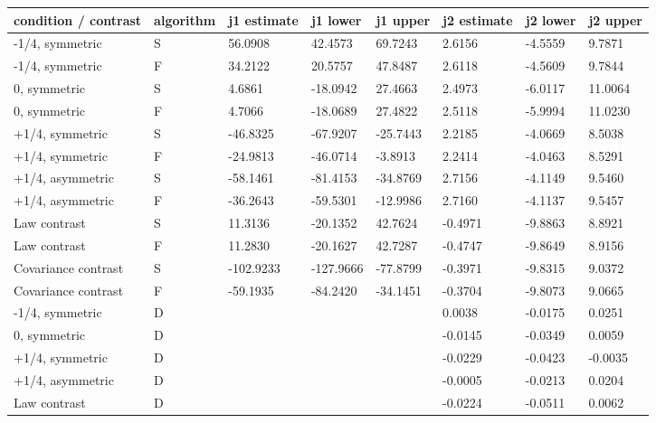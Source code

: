 \begin{tabular}{llllllll}
condition / contrast & algorithm & j1 estimate & j1 lower & j1 upper & j2 estimate & j2 lower & j2 upper \\
\hline
-1/4, symmetric & S & 56.0908 & 42.4573 & 69.7243 & 2.6156 & -4.5559 & 9.7871 \\
-1/4, symmetric & F & 34.2122 & 20.5757 & 47.8487 & 2.6118 & -4.5609 & 9.7844 \\
0, symmetric & S & 4.6861 & -18.0942 & 27.4663 & 2.4973 & -6.0117 & 11.0064 \\
0, symmetric & F & 4.7066 & -18.0689 & 27.4822 & 2.5118 & -5.9994 & 11.0230 \\
+1/4, symmetric & S & -46.8325 & -67.9207 & -25.7443 & 2.2185 & -4.0669 & 8.5038 \\
+1/4, symmetric & F & -24.9813 & -46.0714 & -3.8913 & 2.2414 & -4.0463 & 8.5291 \\
+1/4, asymmetric & S & -58.1461 & -81.4153 & -34.8769 & 2.7156 & -4.1149 & 9.5460 \\
+1/4, asymmetric & F & -36.2643 & -59.5301 & -12.9986 & 2.7160 & -4.1137 & 9.5457 \\
Law contrast & S & 11.3136 & -20.1352 & 42.7624 & -0.4971 & -9.8863 & 8.8921 \\
Law contrast & F & 11.2830 & -20.1627 & 42.7287 & -0.4747 & -9.8649 & 8.9156 \\
Covariance contrast & S & -102.9233 & -127.9666 & -77.8799 & -0.3971 & -9.8315 & 9.0372 \\
Covariance contrast & F & -59.1935 & -84.2420 & -34.1451 & -0.3704 & -9.8073 & 9.0665 \\
-1/4, symmetric & D &  &  &  & 0.0038 & -0.0175 & 0.0251 \\
0, symmetric & D &  &  &  & -0.0145 & -0.0349 & 0.0059 \\
+1/4, symmetric & D &  &  &  & -0.0229 & -0.0423 & -0.0035 \\
+1/4, asymmetric & D &  &  &  & -0.0005 & -0.0213 & 0.0204 \\
Law contrast & D &  &  &  & -0.0224 & -0.0511 & 0.0062 \\
\end{tabular}
